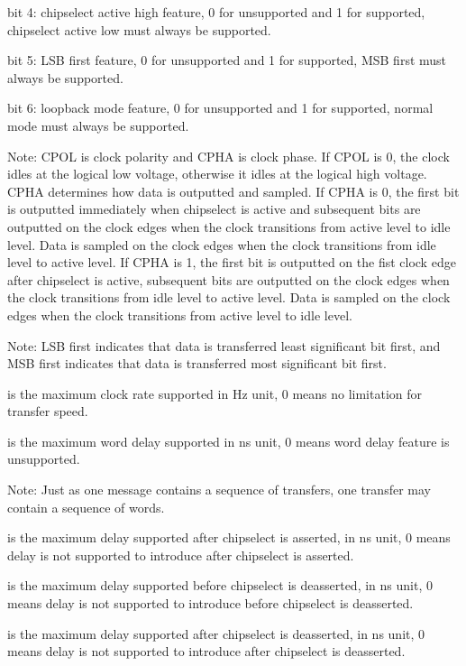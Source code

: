         bit 4: chipselect active high feature, 0 for unsupported and 1 for supported,
            chipselect active low must always be supported.

        bit 5: LSB first feature, 0 for unsupported and 1 for supported, MSB first must always be
            supported.

        bit 6: loopback mode feature, 0 for unsupported and 1 for supported, normal mode
            must always be supported.

Note: CPOL is clock polarity and CPHA is clock phase. If CPOL is 0, the clock idles at the logical
low voltage, otherwise it idles at the logical high voltage. CPHA determines how data is outputted
and sampled. If CPHA is 0, the first bit is outputted immediately when chipselect is active and
subsequent bits are outputted on the clock edges when the clock transitions from active level to idle
level. Data is sampled on the clock edges when the clock transitions from idle level to active level. 
If CPHA is 1, the first bit is outputted on the fist clock edge after chipselect is active, subsequent
bits are outputted on the clock edges when the clock transitions from idle level to active level.
Data is sampled on the clock edges when the clock transitions from active level to idle level.

Note: LSB first indicates that data is transferred least significant bit first, and MSB first
indicates that data is transferred most significant bit first.

 is the maximum clock rate supported in Hz unit, 0 means no limitation
for transfer speed.

 is the maximum word delay supported in ns unit, 0 means word delay
feature is unsupported.

Note: Just as one message contains a sequence of transfers, one transfer may contain
a sequence of words.

 is the maximum delay supported after chipselect is asserted, in ns unit,
0 means delay is not supported to introduce after chipselect is asserted.

 is the maximum delay supported before chipselect is deasserted, in ns unit,
0 means delay is not supported to introduce before chipselect is deasserted.

 is the maximum delay supported after chipselect is deasserted, in ns unit,
0 means delay is not supported to introduce after chipselect is deasserted.


